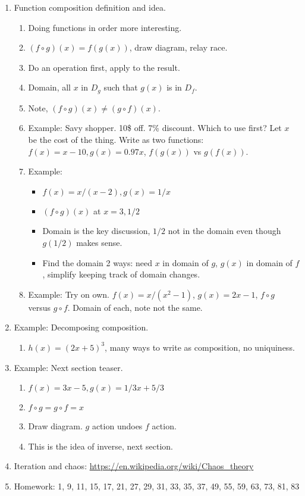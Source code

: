 \documentclass{article}
\begin{document}
\begin{enumerate}
\item Function composition definition and idea.
\begin{enumerate}
\item Doing functions in order more interesting.
\item $(f \circ g)(x) = f(g(x))$, draw diagram, relay race. 
\item Do an operation first, apply to the result. 
\item Domain, all $x$ in $D_g$ such that $g(x)$ is in $D_f$.
\item Note, $(f \circ g)(x) \neq (g \circ f)(x)$.
\item Example: Savy shopper. 10\$ off. 7\% discount. Which to use first? Let $x$ be the cost of the thing. Write as two functions: $f(x) = x-10, g(x) = 0.97x$, $f(g(x))$ vs $g(f(x))$.
\item Example:
\begin{itemize}
\item $f(x) = x/(x-2), g(x) = 1/x$
\item $(f\circ g)(x)$ at $x=3, 1/2$
\item Domain is the key discussion, $1/2$ not in the domain even though $g(1/2)$ makes sense.
\item Find the domain 2 ways: need $x$ in domain of $g$, $g(x)$ in domain of $f$, simplify keeping track of domain changes.
\end{itemize} 
\item Example: Try on own. $f(x) = x/(x^2-1)$, $g(x) = 2x-1$, $f \circ g$ versus $g \circ f$. Domain of each, note not the same.
\end{enumerate}

\item Example: Decomposing composition.
\begin{enumerate}
\item $h(x) = (2x+5)^3$, many ways to write as composition, no uniquiness.
\end{enumerate}

\item Example: Next section teaser.
\begin{enumerate}
\item $f(x) = 3x-5, g(x) = 1/3 x+5/3$
\item $f \circ g = g \circ f = x$
\item Draw diagram. $g$ action undoes $f$ action.
\item This is the idea of inverse, next section.
\end{enumerate}

\item Iteration and chaos: \url{https://en.wikipedia.org/wiki/Chaos_theory}

\item Homework: 1, 9, 11, 15, 17, 21, 27, 29, 31, 33, 35, 37, 49, 55, 59, 63, 73, 81, 83

\end{enumerate}
\end{document}
